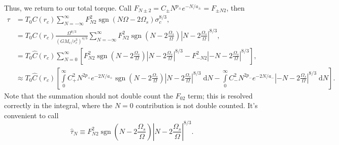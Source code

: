 \documentclass[11pt,
        usenames, %
        dvipsnames %
    ]{article}
\newcommand*{\abs}[1]{\left|#1\right|}
\newcommand*{\p}[1]{\left(#1\right)}
\newcommand*{\s}[1]{\left[#1\right]}
\DeclareMathOperator{\sgn}{sgn}
\begin{document}
Thus, we return to our total torque. Call $F_{N \pm 2} = C_{\pm}N^{p_{\pm}}
e^{-N/a_{\pm}} = F_{\pm N 2}$, then
\begin{align}
    \tau &= T_0 C(r_c) \sum\limits_{N = -\infty}^\infty
            F_{N2}^2 \sgn\p{N\Omega - 2\Omega_s}
                \sigma_c^{8/3},\\
        &= T_0 C(r_c) \frac{\Omega^{8/3}}{\p{GM_c/r_c^3}^{4/3}}
            \sum\limits_{N = -\infty}^\infty
                F_{N2}^2 \sgn\p{N - 2\frac{\Omega_s}{\Omega}}
                    \abs{N - 2\frac{\Omega_s}{\Omega}}^{8/3},\\
        &= T_0 \hat{C}(r_c) \sum\limits_{N = 0}^\infty
            \s{F_{N2}^2 \sgn\p{N - 2\frac{\Omega_s}{\Omega}}
                \abs{N - 2\frac{\Omega_s}{\Omega}}^{8/3} -
                F_{-N2}^2 \abs{-N - 2\frac{\Omega_s}{\Omega}}^{8/3}},\\
        &\approx T_0\hat{C}(r_c)\s{
            \int\limits_0^\infty C_+^2N^{2p_{+}} e^{-2N / a_{+}}
                \sgn\p{N - 2\frac{\Omega_s}{\Omega}}
                \abs{N - 2\frac{\Omega_s}{\Omega}}^{8/3}\;\mathrm{d}N -
             \int\limits_0^\infty C_-^2N^{2p_{-}} e^{-2N / a_{-}}
                    \abs{-N - 2\frac{\Omega_s}{\Omega}}^{8/3}\;\mathrm{d}N}.
\end{align}
Note that the summation should not double count the $F_{02}$ term; this is
resolved correctly in the integral, where the $N = 0$ contribution is not double
counted. It's convenient to call
\begin{equation}
    \hat{\tau}_N \equiv F_{N2}^2 \sgn\p{N - 2\frac{\Omega_s}{\Omega}}
        \abs{N - 2\frac{\Omega_s}{\Omega}}^{8/3}.
\end{equation}
\end{document}
